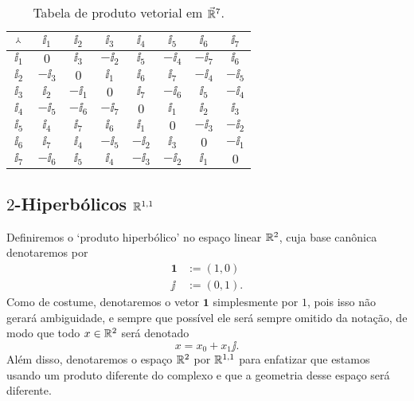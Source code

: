 \begin{table}
	\centering

	\begin{tabular}{c | c c c c c c c}
	\toprule
	${} \Yup {}$&	$\ii_1$	&	$\ii_2$	&	$\ii_3$	&	$\ii_4$	&	$\ii_5$	&	$\ii_6$	&	$\ii_7$		\\
	\hline
	$\ii_1$	&	$0$		&	$\ii_3$	&	$-\ii_2$&	$\ii_5$	&	$-\ii_4$&	$-\ii_7$&	$\ii_6$		\\
	$\ii_2$	&	$-\ii_3$&	$0$		&	$\ii_1$	&	$\ii_6$	&	$\ii_7$	&	$-\ii_4$&	$-\ii_5$	\\
	$\ii_3$	&	$\ii_2$	&	$-\ii_1$&	$0$		&	$\ii_7$	&	$-\ii_6$&	$\ii_5$	&	$-\ii_4$	\\
	$\ii_4$	&	$-\ii_5$&	$-\ii_6$&	$-\ii_7$&	$0$		&	$\ii_1$	&	$\ii_2$	&	$\ii_3$		\\
	$\ii_5$	&	$\ii_4$	&	$\ii_7$	&	$\ii_6$	&	$\ii_1$	&	$0$		&	$-\ii_3$&	$-\ii_2$	\\
	$\ii_6$	&	$\ii_7$	&	$\ii_4$	&	$-\ii_5$&	$-\ii_2$&	$\ii_3$	&	$0$		&	$-\ii_1$	\\
	$\ii_7$	&	$-\ii_6$&	$\ii_5$	&	$\ii_4$	&	$-\ii_3$&	$-\ii_2$&	$\ii_1$	&	$0$			\\
	\bottomrule
	\end{tabular}

	\caption{Tabela de produto vetorial em $\vec{\mathbb{R}}^7$.}
	\label{tab:multiplicacao.octonionica.vetorial}
\end{table}


















\subsection{$2$-Hiperbólicos \texorpdfstring{$\mathbb{R}^{1,1}$}{}}

Definiremos o `produto hiperbólico' no espaço linear $\mathbb{R}^2$, cuja base canônica denotaremos por
	\begin{align*}
	\bm 1 &:= (1,0) \\
	\jj &:= (0,1).
	\end{align*}
Como de costume, denotaremos o vetor $\bm 1$ simplesmente por $1$, pois isso não gerará ambiguidade, e sempre que possível ele será sempre omitido da notação, de modo que todo $x \in \mathbb{R}^2$ será denotado
	\begin{equation*}
	x = x_0 + x_1 \jj.
	\end{equation*}
Além disso, denotaremos o espaço $\mathbb{R}^2$ por $\mathbb{R}^{1,1}$ para enfatizar que estamos usando um produto diferente do complexo e que a geometria desse espaço será diferente.

